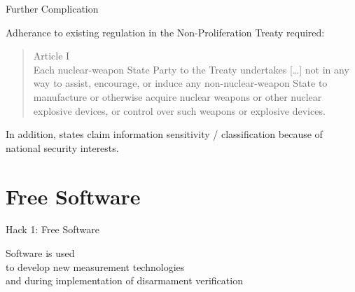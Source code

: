 \documentclass[presentation]{beamer}
\begin{document}
\begin{frame}[label=sec-2-6]{Further Complication}

Adherance to existing regulation in the Non-Proliferation Treaty required:

\begin{quote} %
\small
Article I\\
Each nuclear-weapon State Party to the Treaty undertakes [\ldots{}] not in any way to assist, encourage, or induce any non-nuclear-weapon State to manufacture or otherwise acquire nuclear weapons or other nuclear explosive devices, or control over such weapons or explosive devices.
\end{quote}


In addition, states claim information sensitivity / classification because of national security interests.
\end{frame}



\section{Free Software}
\label{sec-3}
\begin{frame}[label=sec-3-1]{}
\begin{center}
Hack 1: Free Software
\end{center}
\end{frame}

\begin{frame}[label=sec-3-2]{}

\begin{center}
\Large

Software is used\\
to develop new measurement technologies\\
and during implementation of disarmament verification\\[1.5em]

\color{gray!50}{\small (also needs hardware and institutional arrangements...)}
\end{center}
\end{frame}
\end{document}
